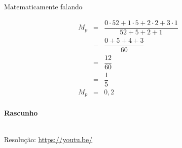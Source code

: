 Matematicamente falando



\begin{eqnarray*}
    M_{p} 	&=& \dfrac{0 \cdot 52 + 1 \cdot 5 + 2 \cdot 2 + 3 \cdot 1}{52 + 5 + 2 + 1} \\
            &=& \dfrac{0 + 5 + 4 + 3}{60} \\
            &=& \dfrac{12}{60} \\
            &=& \dfrac{1}{5} \\
    M_{p}   &=& 0,2 \\
\end{eqnarray*}


\textbf{Rascunho}


\begin{center}
    \href{https://youtu.be/}{
    }\\
    Resolução: \url{https://youtu.be/}
\end{center}

